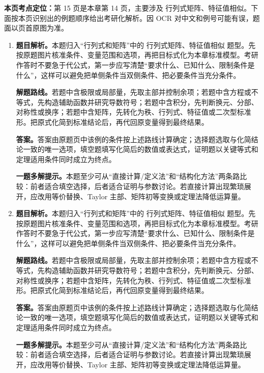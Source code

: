 \begin{solutionblock}
\textbf{本页考点定位：}第 15 页是本章第 14 页，主要涉及 行列式矩阵、特征值相似。下面按本页识别出的例题顺序给出考研化解析。因 OCR 对中文和例号可能有误，题面以页首原图为准。

\begin{enumerate}[label=\textbf{例\arabic*.}, leftmargin=2.4em]

\item \textbf{题目解析。}本题归入“行列式和矩阵”中的 行列式矩阵、特征值相似 题型。先按原题图片核准条件、变量范围和选项，再把目标式化为本章标准模型。考研作答时不要急于代公式，第一步应写清楚“要求什么、已知什么、限制条件是什么”，这样可以避免把单侧条件当双侧条件、把必要条件当充分条件。

\textbf{解题路线。}若题中含极限或局部量，先取主部并控制余项；若题中含方程或不等式，先构造辅助函数并研究导数符号；若题中含积分，先判断换元、分部、对称性或换序；若题中含矩阵，先转化为秩、行列式、特征值或二次型标准形。把原式化简到标准结论后，再代回原变量得到最终结果。

\textbf{答案。}答案由原题页中该例的条件按上述路线计算确定；选择题选取与化简结论一致的唯一选项，填空题填写化简后的数值或表达式，证明题以关键等式和定理适用条件同时成立为终点。

\textbf{一题多解提示。}本题至少可从“直接计算/定义法”和“结构化方法”两条路比较：前者适合填空选择，后者适合证明与参数讨论。若直接计算出现繁琐展开，应改用等价替换、Taylor 主部、矩阵初等变换或定理法降低运算量。

\item \textbf{题目解析。}本题归入“行列式和矩阵”中的 行列式矩阵、特征值相似 题型。先按原题图片核准条件、变量范围和选项，再把目标式化为本章标准模型。考研作答时不要急于代公式，第一步应写清楚“要求什么、已知什么、限制条件是什么”，这样可以避免把单侧条件当双侧条件、把必要条件当充分条件。

\textbf{解题路线。}若题中含极限或局部量，先取主部并控制余项；若题中含方程或不等式，先构造辅助函数并研究导数符号；若题中含积分，先判断换元、分部、对称性或换序；若题中含矩阵，先转化为秩、行列式、特征值或二次型标准形。把原式化简到标准结论后，再代回原变量得到最终结果。

\textbf{答案。}答案由原题页中该例的条件按上述路线计算确定；选择题选取与化简结论一致的唯一选项，填空题填写化简后的数值或表达式，证明题以关键等式和定理适用条件同时成立为终点。

\textbf{一题多解提示。}本题至少可从“直接计算/定义法”和“结构化方法”两条路比较：前者适合填空选择，后者适合证明与参数讨论。若直接计算出现繁琐展开，应改用等价替换、Taylor 主部、矩阵初等变换或定理法降低运算量。

\end{enumerate}
\end{solutionblock}



